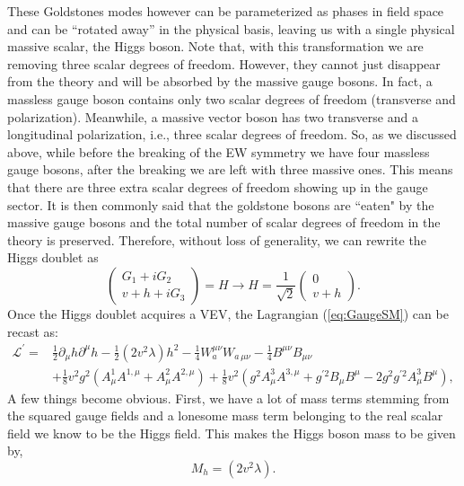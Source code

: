 These Goldstones modes however can be parameterized as phases in field space and can be ``rotated away'' in the physical basis, leaving us with a single physical massive scalar, the Higgs boson. Note that, with this transformation we are removing three scalar degrees of freedom.  However, they cannot just disappear from the theory and will be absorbed by the massive gauge bosons.
%
In fact, a massless gauge boson contains only two scalar degrees of freedom (transverse and polarization). Meanwhile, a massive vector boson has two transverse and a longitudinal polarization, i.e., three scalar degrees of freedom. So, as we discussed above, while before the breaking of the EW symmetry we have four massless gauge bosons, after the breaking we are left with three massive ones. This means that there are three extra scalar degrees of freedom showing up in the gauge sector. It is then commonly said that the goldstone bosons are ``eaten" by the massive gauge bosons and the total number of scalar degrees of freedom in the theory is preserved. Therefore, without loss of generality, we can rewrite the Higgs doublet as
%
\begin{equation}
 \begin{pmatrix}
G_1 + i G_2 \\ 
v + h + i G_3 
\end{pmatrix} = H  \rightarrow H =  \frac{1}{\sqrt{2}} \begin{pmatrix}
0 \\ 
v + h 
\end{pmatrix}  .
\label{shame}
\end{equation}
Once the Higgs doublet acquires a VEV, the Lagrangian (\ref{eq:GaugeSM}) can be recast as:
%
\begin{align}
\mathcal{L}^\prime = & \frac{1}{2} \partial_\mu h \partial^\mu h - \frac{1}{2} (2v^2 \lambda) h^2
 - \frac{1}{4}  W^{\mu \nu}_a W_{a \, \mu \nu}  
- \frac{1}{4}  B^{\mu \nu} B_{\mu \nu}  \nonumber \\
& + \frac{1}{8} v^2 g^2 (A^1_\mu A^{1,\mu}+ A^2_\mu A^{2,\mu}) +  \frac{1}{8} v^2  (g^2  A^3_\mu A^{3,\mu} + g^{\prime 2} B_\mu B^\mu - 2 g^2 g^{\prime 2} A^3_\mu B^\mu )  , 
\label{complicatedpart}
\end{align}
%
A few things become obvious. First, we have a lot of mass terms stemming from the squared gauge fields and a lonesome mass term belonging to the real scalar field we know to be the Higgs field. This makes the Higgs boson mass to be given by,
%
\begin{equation}
M_h= (2v^2 \lambda).  
\end{equation}
